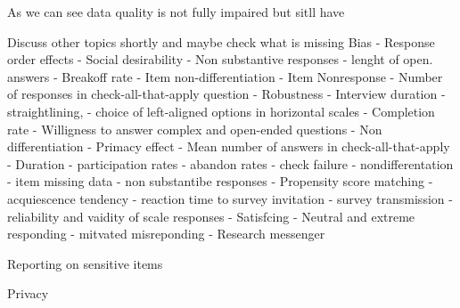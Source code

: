 As we can see data quality is not fully impaired but sitll have 

Discuss other topics shortly and maybe check what is missing
Bias
- Response order effects
- Social desirability
- Non substantive responses
- lenght of open. answers
- Breakoff rate
- Item non-differentiation
- Item Nonresponse
- Number of responses in check-all-that-apply question
- Robustness
- Interview duration
- straightlining,
- choice of left-aligned options in horizontal scales
- Completion rate
- Willigness to answer complex and open-ended questions
- Non differentiation
- Primacy effect
- Mean number of answers in check-all-that-apply
- Duration
- participation rates
- abandon rates
- check failure
- nondifferentation
- item missing data
- non substantibe responses
- Propensity score matching
- acquiescence tendency
- reaction time to survey invitation
- survey transmission
- reliability and vaidity of scale responses
- Satisfcing
- Neutral and extreme responding 
- mitvated misreponding
 - Research messenger

Reporting on sensitive items


Privacy
